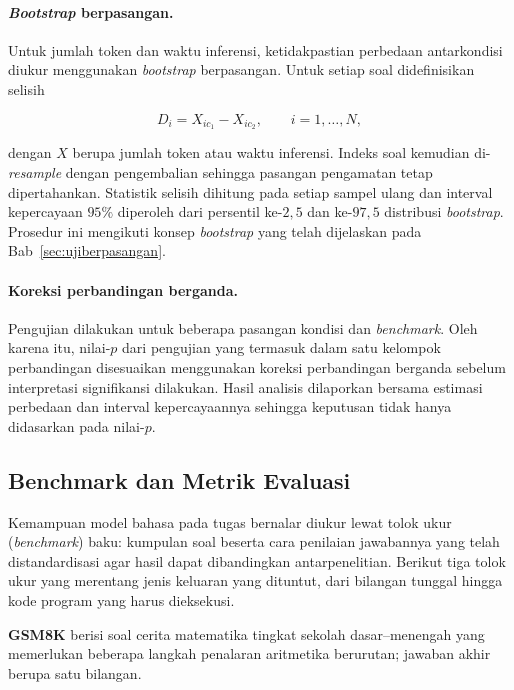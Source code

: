 \paragraph{\textit{Bootstrap} berpasangan.}

Untuk jumlah token dan waktu inferensi, ketidakpastian perbedaan antarkondisi
diukur menggunakan \textit{bootstrap} berpasangan. Untuk setiap soal
didefinisikan selisih

\begin{equation}
    D_i = X_{ic_1}-X_{ic_2},
    \qquad i=1,\ldots,N,
    \label{eq:selisih-bootstrap}
\end{equation}

dengan $X$ berupa jumlah token atau waktu inferensi. Indeks soal kemudian
di-\textit{resample} dengan pengembalian sehingga pasangan pengamatan tetap
dipertahankan. Statistik selisih dihitung pada setiap sampel ulang dan
interval kepercayaan $95\%$ diperoleh dari persentil ke-$2{,}5$ dan
ke-$97{,}5$ distribusi \textit{bootstrap}. Prosedur ini mengikuti konsep
\textit{bootstrap} yang telah dijelaskan pada Bab~\ref{sec:ujiberpasangan}.

\paragraph{Koreksi perbandingan berganda.}

Pengujian dilakukan untuk beberapa pasangan kondisi dan \textit{benchmark}.
Oleh karena itu, nilai-$p$ dari pengujian yang termasuk dalam satu kelompok
perbandingan disesuaikan menggunakan koreksi perbandingan berganda sebelum
interpretasi signifikansi dilakukan. Hasil analisis dilaporkan bersama
estimasi perbedaan dan interval kepercayaannya sehingga keputusan tidak hanya
didasarkan pada nilai-$p$.

\subsection{Benchmark dan Metrik Evaluasi}
\label{sec:benchmark}

Kemampuan model bahasa pada tugas bernalar diukur lewat tolok ukur
(\textit{benchmark}) baku: kumpulan soal beserta cara penilaian jawabannya
yang telah distandardisasi agar hasil dapat dibandingkan antarpenelitian.
Berikut tiga tolok ukur yang merentang jenis keluaran yang dituntut, dari
bilangan tunggal hingga kode program yang harus dieksekusi.

\textbf{GSM8K} \citep{gsm8k} berisi soal cerita matematika tingkat
sekolah dasar--menengah yang memerlukan beberapa langkah penalaran
aritmetika berurutan; jawaban akhir berupa satu bilangan.

